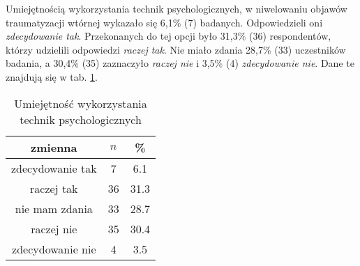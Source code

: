 
Umiejętnością wykorzystania technik psychologicznych, w niwelowaniu objawów traumatyzacji wtórnej wykazało się 6,1\% (7) badanych. Odpowiedzieli oni \textit{zdecydowanie tak}. Przekonanych do tej opcji było 31,3\% (36) respondentów, którzy udzielili odpowiedzi \textit{raczej tak}. Nie miało zdania 28,7\% (33) uczestników badania, a  30,4\% (35) zaznaczyło \textit{raczej nie} i 3,5\% (4) \textit{zdecydowanie nie}. Dane te znajdują się w  tab. \ref{tab:Q12}.

\begin{table}[H]
\caption{Umiejętność wykorzystania technik psychologicznych}
\centering
\begin{tabular}{ | c | c | c |}
\hline
zmienna & $n$ & \% \\
\hline
zdecydowanie tak  &  7  & 6.1 \\
\hline
raczej tak  &  36  & 31.3\\
\hline
nie mam zdania  &  33  & 28.7 \\
\hline
raczej nie  &  35  & 30.4 \\
\hline
zdecydowanie nie  &  4  & 3.5\\
\hline
\end{tabular}
\label{tab:Q12}
\end{table}
